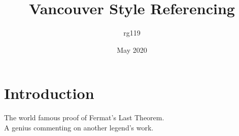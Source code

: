\documentclass{article}
\title{Vancouver Style Referencing}
\author{rg119 }
\date{May 2020}
\begin{document}
\maketitle

\section{Introduction}
The world famous proof of Fermat's Last Theorem.\cite{10.2307/2118559}\\
A genius commenting on another legend's work.\cite{tao2006perelmans}\\



\end{document}
